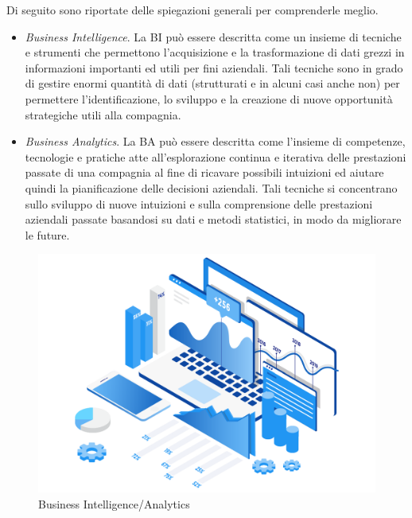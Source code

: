 Di seguito sono riportate delle spiegazioni generali per comprenderle meglio.\cite{academiaedu_bi_and_ba}

\begin{itemize}
    \item \textit{Business Intelligence}. La BI può essere descritta come un insieme di tecniche e strumenti che permettono l'acquisizione e la trasformazione di dati grezzi in informazioni importanti ed utili per fini aziendali. Tali tecniche sono in grado di gestire enormi quantità di dati (strutturati e in alcuni casi anche non) per permettere l'identificazione, lo sviluppo e la creazione di nuove opportunità strategiche utili alla compagnia.
    \item \textit{Business Analytics}. La BA può essere descritta come l'insieme di competenze, tecnologie e pratiche atte all'esplorazione continua e iterativa delle prestazioni passate di una compagnia al fine di ricavare possibili intuizioni ed aiutare quindi la pianificazione delle decisioni aziendali. Tali tecniche si concentrano sullo sviluppo di nuove intuizioni e sulla comprensione delle prestazioni aziendali passate basandosi su dati e metodi statistici, in modo da migliorare le future.
\end{itemize}

\begin{figure}[H]
    \centering
    \includegraphics[width=0.75\linewidth]{figure/capitolo_2/Business Intelligence - Business Analytics.pdf}
    \caption{Business Intelligence/Analytics}
    \label{fig:Business Intelligence - Business Analytics}
\end{figure}
